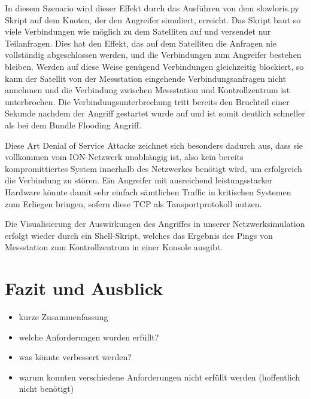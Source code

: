 \documentclass{article}
\begin{document}
In diesem Szenario wird dieser Effekt durch das Ausführen von dem slowloris.py Skript auf dem Knoten, der den Angreifer simuliert, erreicht. Das Skript baut so viele Verbindungen wie möglich zu dem Satelliten auf und versendet nur Teilanfragen. Dies hat den Effekt, das auf dem Satelliten die Anfragen nie vollständig abgeschlossen werden, und die Verbindungen zum Angreifer bestehen bleiben. Werden auf diese Weise genügend Verbindungen gleichzeitig blockiert, so kann der Satellit von der  Messstation eingehende Verbindungsanfragen nicht annehmen und die Verbindung zwischen Messstation und Kontrollzentrum ist unterbrochen. Die Verbindungsunterbrechung tritt bereits den Bruchteil einer Sekunde nachdem der Angriff gestartet wurde auf und ist somit deutlich schneller als bei dem Bundle Flooding Angriff.\par
Diese Art Denial of Service Attacke zeichnet sich besonders dadurch aus, dass sie vollkommen vom ION-Netzwerk unabhängig ist, also kein bereits kompromittiertes System innerhalb des Netzwerkes benötigt wird, um erfolgreich die Verbindung zu stören. Ein Angreifer mit ausreichend leistungsstarker Hardware könnte damit sehr einfach sämtlichen Traffic in kritischen Systemen zum Erliegen bringen, sofern diese TCP als Tansportprotokoll nutzen.\par
Die Visualisierung der Auswirkungen des Angriffes in unserer Netzwerksimulation erfolgt wieder durch ein Shell-Skript, welches das Ergebnis des Pings von Messstation zum Kontrollzentrum in einer Konsole ausgibt. 

\section{Fazit und Ausblick}

\begin{itemize}
\item kurze Zusammenfassung
\item welche Anforderungen wurden erfüllt?
\item was könnte verbessert werden?
\item warum konnten verschiedene Anforderungen nicht erfüllt werden (hoffentlich nicht benötigt)
\end{itemize}



\newpage
\printbibliography
\end{document}
